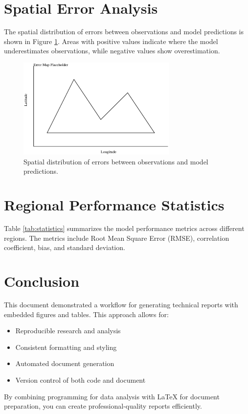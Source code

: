 \documentclass[11pt,a4paper]{article}
\begin{document}
\section{Spatial Error Analysis}
\label{sec:spatial}

The spatial distribution of errors between observations and model predictions is shown in Figure \ref{fig:errormap}. Areas with positive values indicate where the model underestimates observations, while negative values show overestimation.

\begin{figure}[H]
    \centering
    \includegraphics[width=0.7\textwidth]{figures/error_map.pdf}
    \caption{Spatial distribution of errors between observations and model predictions.}
    \label{fig:errormap}
\end{figure}

\section{Regional Performance Statistics}
\label{sec:statistics}

Table \ref{tab:statistics} summarizes the model performance metrics across different regions. The metrics include Root Mean Square Error (RMSE), correlation coefficient, bias, and standard deviation.



\section{Conclusion}
\label{sec:conclusion}

This document demonstrated a workflow for generating technical reports with embedded figures and tables. This approach allows for:

\begin{itemize}
    \item Reproducible research and analysis
    \item Consistent formatting and styling
    \item Automated document generation
    \item Version control of both code and document
\end{itemize}

By combining programming for data analysis with \LaTeX{} for document preparation, you can create professional-quality reports efficiently.
\end{document}

